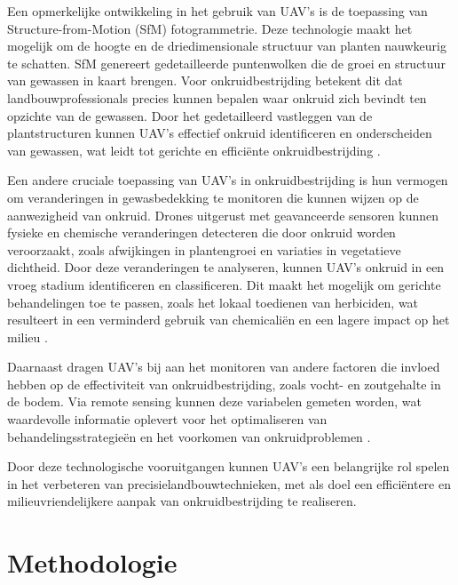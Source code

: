 \documentclass{hogent-article}
\begin{document}
Een opmerkelijke ontwikkeling in het gebruik van UAV's is de toepassing van Structure-from-Motion (SfM) fotogrammetrie. Deze technologie maakt het mogelijk om de hoogte en de driedimensionale structuur van planten nauwkeurig te schatten. SfM genereert gedetailleerde puntenwolken die de groei en structuur van gewassen in kaart brengen. Voor onkruidbestrijding betekent dit dat landbouwprofessionals precies kunnen bepalen waar onkruid zich bevindt ten opzichte van de gewassen. Door het gedetailleerd vastleggen van de plantstructuren kunnen UAV’s effectief onkruid identificeren en onderscheiden van gewassen, wat leidt tot gerichte en efficiënte onkruidbestrijding \autocite{liu2021boost}.

Een andere cruciale toepassing van UAV's in onkruidbestrijding is hun vermogen om veranderingen in gewasbedekking te monitoren die kunnen wijzen op de aanwezigheid van onkruid. Drones uitgerust met geavanceerde sensoren kunnen fysieke en chemische veranderingen detecteren die door onkruid worden veroorzaakt, zoals afwijkingen in plantengroei en variaties in vegetatieve dichtheid. Door deze veranderingen te analyseren, kunnen UAV’s onkruid in een vroeg stadium identificeren en classificeren. Dit maakt het mogelijk om gerichte behandelingen toe te passen, zoals het lokaal toedienen van herbiciden, wat resulteert in een verminderd gebruik van chemicaliën en een lagere impact op het milieu \autocite{zhang2021review}.

Daarnaast dragen UAV’s bij aan het monitoren van andere factoren die invloed hebben op de effectiviteit van onkruidbestrijding, zoals vocht- en zoutgehalte in de bodem. Via remote sensing kunnen deze variabelen gemeten worden, wat waardevolle informatie oplevert voor het optimaliseren van behandelingsstrategieën en het voorkomen van onkruidproblemen \autocite{hunt2018good}.

Door deze technologische vooruitgangen kunnen UAV’s een belangrijke rol spelen in het verbeteren van precisielandbouwtechnieken, met als doel een efficiëntere en milieuvriendelijkere aanpak van onkruidbestrijding te realiseren.





\section{Methodologie}%
\label{sec:methodologie}
\end{document}

